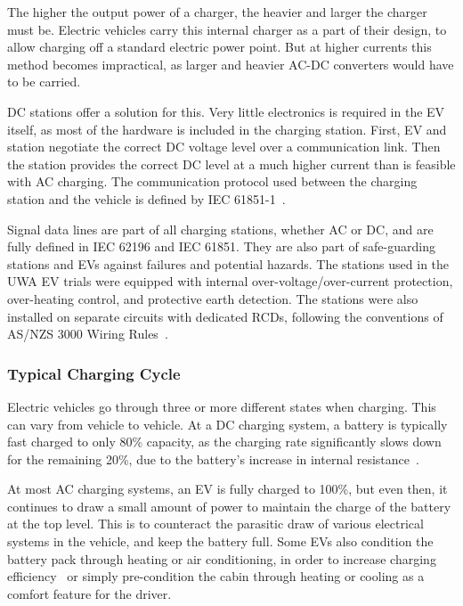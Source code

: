 The higher the output power of a charger, the heavier and larger the charger must be. Electric vehicles carry this internal charger as a part of their design, to allow charging off a standard electric power point. But at higher currents this method becomes impractical, as larger and heavier AC-DC converters would have to be carried. 

DC stations offer a solution for this. Very little electronics is required in the EV itself, as most of the hardware is included in the charging station. First, EV and station negotiate the correct DC voltage level over a communication link. Then the station provides the correct DC level at a much higher current than is feasible with AC charging. The communication protocol used between the charging station and the vehicle is defined by IEC 61851-1~\cite{international_electrotechnical_commission_iec_2017}.

Signal data lines are part of all charging stations, whether AC or DC, and are fully defined in IEC 62196 and IEC 61851. They are also part of safe-guarding stations and EVs against failures and potential hazards. The stations used in the UWA EV trials were equipped with internal over-voltage/over-current protection, over-heating control, and protective earth detection. The stations were also installed on separate circuits with dedicated RCDs, following the conventions of AS/NZS 3000 Wiring Rules~\cite{standards_association_of_australia_electrical_2018}.

\subsubsection{Typical Charging Cycle}
Electric vehicles go through three or more different states when charging. This can vary from vehicle to vehicle. At a DC charging system, a battery is typically fast charged to only 80\% capacity, as the charging rate significantly slows down for the remaining 20\%, due to the battery's increase in internal resistance~\cite{tritium_pty_ltd_veefil--electric_2015}.

At most AC charging systems, an EV is fully charged to 100\%, but even then, it continues to draw a small amount of power to maintain the charge of the battery at the top level. This is to counteract the parasitic draw of various electrical systems in the vehicle, and keep the battery full. Some EVs also condition the battery pack through heating or air conditioning, in order to increase charging efficiency~\cite{wang_critical_2016, bullis_electric_2013} or simply pre-condition the cabin through heating or cooling as a comfort feature for the driver. 

